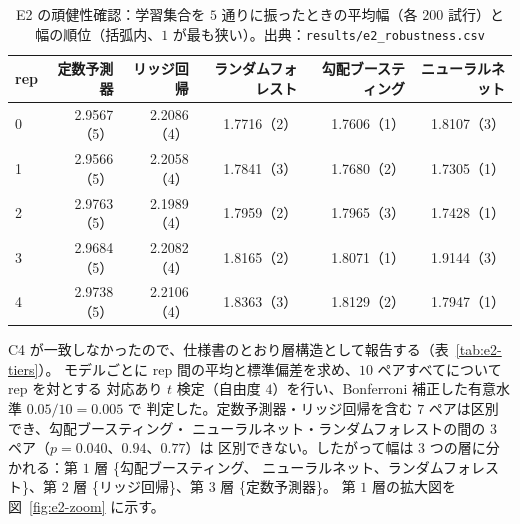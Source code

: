 \documentclass[a4paper,11pt]{jsarticle}
\theoremstyle{definition}
\theoremstyle{plain}
\theoremstyle{remark}
\begin{document}
\begin{table}[htbp]
  \centering
  \caption{E2 の頑健性確認：学習集合を $5$ 通りに振ったときの平均幅（各 $200$ 試行）と
    幅の順位（括弧内、$1$ が最も狭い）。出典：\texttt{results/e2\_robustness.csv}}
  \label{tab:e2-robustness}
  \small
  \begin{tabular}{lrrrrr}
    \toprule
    rep & 定数予測器 & リッジ回帰 & ランダムフォレスト & 勾配ブースティング & ニューラルネット \\
    \midrule
    0 & 2.9567（5） & 2.2086（4） & 1.7716（2） & 1.7606（1） & 1.8107（3） \\
    1 & 2.9566（5） & 2.2058（4） & 1.7841（3） & 1.7680（2） & 1.7305（1） \\
    2 & 2.9763（5） & 2.1989（4） & 1.7959（2） & 1.7965（3） & 1.7428（1） \\
    3 & 2.9684（5） & 2.2082（4） & 1.8165（2） & 1.8071（1） & 1.9144（3） \\
    4 & 2.9738（5） & 2.2106（4） & 1.8363（3） & 1.8129（2） & 1.7947（1） \\
    \bottomrule
  \end{tabular}
\end{table}

C4 が一致しなかったので、仕様書のとおり層構造として報告する（表~\ref{tab:e2-tiers}）。
モデルごとに rep 間の平均と標準偏差を求め、$10$ ペアすべてについて rep を対とする
対応あり $t$ 検定（自由度 $4$）を行い、Bonferroni 補正した有意水準 $0.05/10=0.005$ で
判定した。定数予測器・リッジ回帰を含む $7$ ペアは区別でき、勾配ブースティング・
ニューラルネット・ランダムフォレストの間の $3$ ペア（$p=0.040$、$0.94$、$0.77$）は
区別できない。したがって幅は $3$ つの層に分かれる：第 $1$ 層 \{勾配ブースティング、
ニューラルネット、ランダムフォレスト\}、第 $2$ 層 \{リッジ回帰\}、第 $3$ 層 \{定数予測器\}。
第 $1$ 層の拡大図を図~\ref{fig:e2-zoom} に示す。
\end{document}
